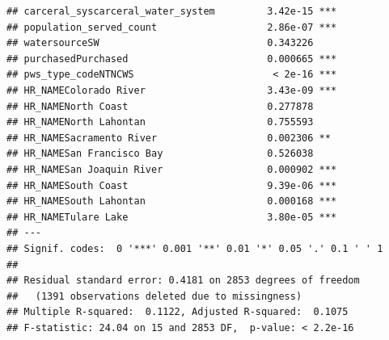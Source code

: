 \documentclass[
]{article}
\newenvironment{Shaded}{\begin{snugshade}}{\end{snugshade}}
\newcommand{\AttributeTok}[1]{\textcolor[rgb]{0.13,0.29,0.53}{#1}}
\newcommand{\DecValTok}[1]{\textcolor[rgb]{0.00,0.00,0.81}{#1}}
\newcommand{\FunctionTok}[1]{\textcolor[rgb]{0.13,0.29,0.53}{\textbf{#1}}}
\newcommand{\NormalTok}[1]{#1}
\newcommand{\OtherTok}[1]{\textcolor[rgb]{0.56,0.35,0.01}{#1}}
\newcommand{\SpecialCharTok}[1]{\textcolor[rgb]{0.81,0.36,0.00}{\textbf{#1}}}
\newcommand{\StringTok}[1]{\textcolor[rgb]{0.31,0.60,0.02}{#1}}
\begin{document}
\begin{verbatim}
## carceral_syscarceral_water_system         3.42e-15 ***
## population_served_count                   2.86e-07 ***
## watersourceSW                             0.343226    
## purchasedPurchased                        0.000665 ***
## pws_type_codeNTNCWS                        < 2e-16 ***
## HR_NAMEColorado River                     3.43e-09 ***
## HR_NAMENorth Coast                        0.277878    
## HR_NAMENorth Lahontan                     0.755593    
## HR_NAMESacramento River                   0.002306 ** 
## HR_NAMESan Francisco Bay                  0.526038    
## HR_NAMESan Joaquin River                  0.000902 ***
## HR_NAMESouth Coast                        9.39e-06 ***
## HR_NAMESouth Lahontan                     0.000168 ***
## HR_NAMETulare Lake                        3.80e-05 ***
## ---
## Signif. codes:  0 '***' 0.001 '**' 0.01 '*' 0.05 '.' 0.1 ' ' 1
## 
## Residual standard error: 0.4181 on 2853 degrees of freedom
##   (1391 observations deleted due to missingness)
## Multiple R-squared:  0.1122, Adjusted R-squared:  0.1075 
## F-statistic: 24.04 on 15 and 2853 DF,  p-value: < 2.2e-16
\end{verbatim}

\begin{Shaded}
\end{Shaded}
\end{document}
